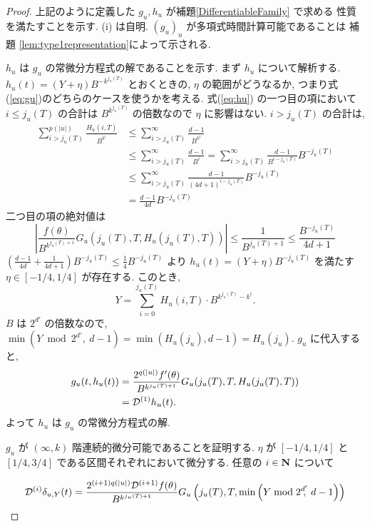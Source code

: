\begin{proof}
 上記のように定義した $g_u, h_u$ が補題\ref{DifferentiableFamily} で求める
 性質を満たすことを示す. (i) は自明. 
 $(g_u)_u$ が多項式時間計算可能であることは
  補題 \ref{lem:type1representation}によって示される.

 $h_u$ は $g_u$ の常微分方程式の解であることを示す.
 まず $h_u$ について解析する. 
  $h_u(t) = (Y + \eta) B^{-k^{j_u(T)}}$ とおくときの, $\eta$ の範囲がどうなるか,
  つまり式(\ref{eq:gu})のどちらのケースを使うかを考える.
  式(\ref{eq:hu}) の一つ目の項において
 $i \le j_u(T)$ の合計は $B^{k^{j_u(T)}}$ の倍数なので $\eta$ に影響はない.
  $i > j_u(T)$ の合計は, 
 \begin{align*}
  \sum_{i>j_u(T)}^{p(|u|)} \frac{H_u(i, T)}{B^{k^i}} 
  & \le \sum_{i>j_u(T)}^\infty \frac{d-1}{B^{k^i}}  \\
  & \le \sum_{i>j_u(T)}^\infty \frac{d-1}{B^i} 
   = \sum_{i>j_u(T)}^\infty \frac{d-1}{B^{i-j_u(T)}}B^{-j_u(T)} \\
  & \le \sum_{i>j_u(T)}^\infty \frac{d-1}{(4d+1)^{i-j_u(T)}}B^{-j_u(T)} \\
  & = \frac{d-1}{4d}B^{-j_u(T)}
 \end{align*}
 二つ目の項の絶対値は
 \begin{equation}
  \left| \frac{f(\theta)}{B^{k^{j_u(T)+1}}} G_u(j_u(T), T, H_u(j_u(T), T)) \right|
  \le \frac{1}{B^{j_u(T)+1}}
  \le \frac{B^{-j_u(T)}}{4d+1}
 \end{equation}
 $(\frac{d-1}{4d} + \frac{1}{4d+1})B^{-j_u(T)} \le \frac 1 4 B^{-j_u(T)} $
  より $h_u(t) = (Y + \eta) B^{-j_u(T)}$ を満たす $\eta \in [-1/4, 1/4]$
 が存在する. このとき,
 \begin{equation}
  Y = \sum_{i=0}^{j_u(T)}H_u(i, T) \cdot B^{k^{j_u(T)} - k^i} .
 \end{equation}
 $B$ は $2^{d'}$ の倍数なので, 
 $\min (Y \bmod 2^{d'}\!\!\!,\ d-1) = \min (H_u(j_u), d-1) = H_u(j_u)$. 
 $g_u$ に代入すると,
 \begin{align*}
   g_u(t, h_u(t)) 
  & =  \frac{2^{q(|u|)} f'(\theta)}{B^{k^{j_u(T)+1}}}
   G_u(j_u(T), T, H_u(j_u(T), T)) \\
  & =  \mathcal D^{(1)}h_u(t).
 \end{align*}
 よって $h_u$ は $g_u$ の常微分方程式の解.

  $g_u$ が $(\infty, k)$ 階連続的微分可能であることを証明する.
  $\eta$ が $[-1/4, 1/4]$ と $[1/4, 3/4]$ である区間それぞれにおいて微分する.
  任意の $i \in \mathbf N$ について

  \begin{equation}
   \mathcal D^{(i)}\delta_{u,Y}(t) 
    = \frac{2^{(i+1)q(|u|)} \mathcal D^{(i+1)}f(\theta)}{B^{k^{j_u(T)+1}}}
    G_u\left( j_u(T), T, \min \left(Y \bmod 2^{d'}\!\!\!,\ d-1 \right) \right)
  \end{equation}


\end{proof}
